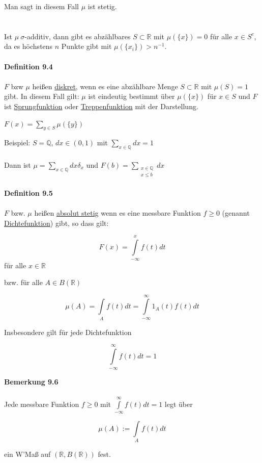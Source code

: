 \documentclass[10pt,a4paper]{report}
\newcommand{\R}{\mathbb{R}}
\numberwithin{equation}{section}
\numberwithin{figure}{section}
\theoremstyle{plain}
\theoremstyle{definition}
\theoremstyle{plain}
\theoremstyle{definition}
\theoremstyle{remark}
\theoremstyle{plain}
\theoremstyle{plain}
\theoremstyle{plain}
\newcommand{\1}{ \mathbb{1} } %
\begin{document}
Man sagt in diesem Fall $\mu$ ist stetig.\\\\\\
Ist $\mu~ \sigma$-additiv, dann gibt es abzählbares $S \subset \R$ mit $\mu(\{x\})=0$ für alle $x \in S^c$, da es höchstens $n$ Punkte gibt mit $\mu(\{x_i\})>n^{-1}$. \\\\
\textbf{Definition 9.4}\\\\
$F$ bzw $\mu$ heißen \underline{diskret}, wenn es eine abzählbare Menge $S \subset \R$ mit $\mu(S)=1$ gibt. In diesem Fall gilt: $\mu$ ist eindeutig bestimmt über $\mu(\{x\})$ für $x \in S$ und $F$ ist \underline{Sprungfunktion} oder \underline{Treppenfunktion} mit der Darstellung.
\begin{center}
$F(x)=\sum\limits_{y \in S} \mu(\{y\})$
\end{center}  
Beispiel:
$S=\mathbb{Q}$, $dx \in (0,1)$ mit $\sum\limits_{x \in \mathbb{Q}} dx=1$\\\\
Dann ist $\mu=\sum\limits_{x \in \mathbb{Q} }dx\delta_x$ und $F(b)=\sum\limits_{\substack{x \in \mathbb{Q}\\ x \leq b}} dx$\\\\
\textbf{Definition 9.5}\\\\
$F$ bzw. $\mu$ heißen \underline{absolut stetig} wenn es eine messbare Funktion $f\geq 0$ (genannt \underline{Dichtefunktion}) gibt, so dass gilt:
\begin{center}
\[F(x)=\int\limits_{-\infty}^xf(t)dt\] für alle $x \in \R$
\end{center}
bzw. für alle $A \in B(\R)$
\begin{center}
\[\mu(A)=\int\limits_A f(t) dt=\int\limits_{-\infty}^\infty 1_A(t)f(t)dt\]
\end{center}
Insbesondere gilt für jede Dichtefunktion
\begin{center}
\[\int\limits_{-\infty}^\infty f(t)dt=1\]
\end{center}
\textbf{Bemerkung 9.6}\\\\
Jede messbare Funktion $f \geq 0$ mit $\int\limits_{-\infty}^\infty f(t)dt=1$ legt über 
\begin{center}
\[\mu(A):=\int\limits_Af(t)dt\]
\end{center}
ein W'Maß auf $(\R,B(\R))$ fest.\\\\
\end{document}
